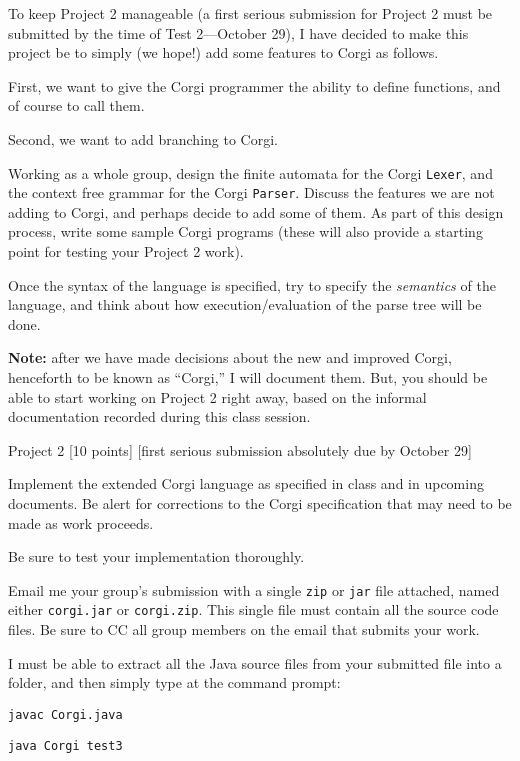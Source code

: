 To keep Project 2 manageable (a first serious submission for Project 2 must be submitted by the time of Test 2---October 29),
I have decided to make this project be to simply (we hope!) add some
features to Corgi as follows.
\medskip

First, we want to give the Corgi programmer the ability to define functions, and of course to call them.
\medskip

Second, we want to add branching to Corgi.
\medskip
\Outdent

\doit Working as a whole group, design the finite automata for the Corgi {\tt Lexer}, and the
context free grammar for the Corgi {\tt Parser}.
Discuss the features we are not adding to Corgi, and perhaps decide to add some of them.
As part of this design process, write some sample Corgi programs (these will also provide a
starting point for testing your Project 2 work).
\medskip

\doit Once the syntax of the language is specified, try to specify the {\it semantics\/} of the language,
and think about how execution/evaluation of the parse tree will be done.
\bigskip

{\bf Note:}  after we have made decisions about the new and improved Corgi,
henceforth to be known as ``Corgi,''  I will document them.
But, you should be able to start working on Project 2 right away, based on the informal
documentation recorded during this class session.
\border

{\bigboldfont Project 2} [10 points] [first serious submission absolutely due by October 29]
\medskip

Implement the extended Corgi language as specified in class and in upcoming documents.
Be alert for corrections to the Corgi specification that may need to be made as work proceeds.
\medskip

Be sure to test your implementation thoroughly.
\medskip

Email me your group's submission with a single {\tt zip} or {\tt jar} file attached, named either
{\tt corgi.jar} or {\tt corgi.zip}.  This single file must contain all the source code files.
Be sure to CC all group members on the email that submits your work.
\medskip

I must be able to extract all the Java source files from your submitted file into a folder, and then simply
type at the command prompt:
\medskip

{\tt javac Corgi.java}

{\tt java Corgi test3}
\medskip

